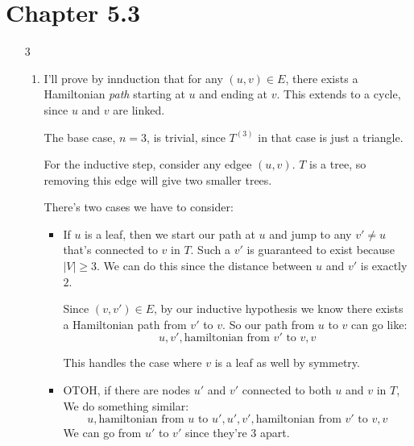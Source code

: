 \documentclass[12pt]{article}
\begin{document}
\section{Chapter 5.3}

\begin{enumerate}
    \item[3] \begin{enumerate}
            \item I'll prove by innduction that for any $(u, v) \in E$, there exists
                  a Hamiltonian \textit{path} starting at $u$ and ending at $v$.
                  This extends to a cycle, since $u$ and $v$ are linked.

                  The base case, $n=3$, is trivial, since $T^{(3)}$ in that case is just a triangle.

                  For the inductive step, consider any edgee $(u, v)$.
                  $T$ is a tree, so removing this edge will give two smaller trees.

                  There's two cases we have to consider:
                  \begin{itemize}
                      \item If $u$ is a leaf, then we start our path at $u$ and jump
                            to any $v' \ne u$ that's connected to $v$ in $T$.
                            Such a $v'$ is guaranteed to exist because $|V| \ge 3$.
                            We can do this since the distance between $u$ and $v'$ is exactly $2$.

                            Since $(v, v') \in E$, by our inductive hypothesis we know
                            there exists a Hamiltonian path from $v'$ to $v$.
                            So our path from $u$ to $v$ can go like:
                            \[u, v', \text{hamiltonian from $v'$ to $v$}, v\]

                            This handles the case where $v$ is a leaf as well by symmetry.

                      \item OTOH, if there are nodes $u'$ and $v'$ connected to both $u$ and $v$ in $T$,
                            We do something similar:
                            \[u, \text{hamiltonian from $u$ to $u'$}, u', v', \text{hamiltonian from $v'$ to $v$}, v\]
                            We can go from $u'$ to $v'$ since they're $3$ apart.
                  \end{itemize}


\end{enumerate}
\end{enumerate}
\end{document}
